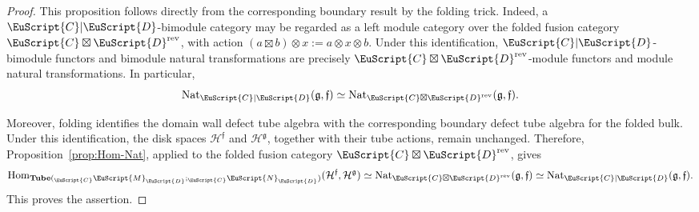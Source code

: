 \documentclass[a4paper,11pt]{article}
\theoremstyle{definition}
\theoremstyle{remark}
\newcommand\eC           {\EuScript{C}}
\newcommand\eD           {\EuScript{D}}
\newcommand\eM          {\EuScript{M}}
\newcommand\eN         {\EuScript{N}}
\newcommand{\Hom}{\operatorname{Hom}}
\newcommand{\Tube}{\mathbf{Tube}}
\begin{document}
\begin{proof}
This proposition follows directly from the corresponding boundary result by the folding trick. Indeed, a
$\eC|\eD$-bimodule category may be regarded as a left module category over the folded fusion category
$\eC\boxtimes\eD^{\mathrm{rev}}$, with action $(a\boxtimes b)\otimes x := a\otimes x\otimes b$. Under this identification, $\eC|\eD$-bimodule functors and bimodule natural transformations are precisely $\eC\boxtimes\eD^{\mathrm{rev}}$-module functors and module natural transformations. In particular,
\begin{equation*}
    \operatorname{Nat}_{\eC|\eD}(\mathfrak g,\mathfrak f)
    \simeq
    \operatorname{Nat}_{\eC\boxtimes\eD^{\mathrm{rev}}}
    (\mathfrak g,\mathfrak f).
\end{equation*}

Moreover, folding identifies the domain wall defect tube algebra with the corresponding boundary defect tube algebra for the folded bulk. Under this identification, the disk spaces $\mathcal H^{\mathfrak f}$ and $\mathcal H^{\mathfrak g}$, together with their tube actions, remain unchanged. Therefore, Proposition~\ref{prop:Hom-Nat}, applied to the folded fusion category
$\eC\boxtimes\eD^{\mathrm{rev}}$, gives
\begin{equation*}
    \Hom_{\Tube({}_{\eC}\eM_{\eD};{}_{\eC}\eN_{\eD})}(\mathcal H^{\mathfrak f},\mathcal H^{\mathfrak g})\simeq \operatorname{Nat}_{\eC\boxtimes\eD^{\mathrm{rev}}} (\mathfrak g,\mathfrak f)\simeq  \operatorname{Nat}_{\eC|\eD} (\mathfrak g,\mathfrak f).
\end{equation*}
This proves the assertion.
\end{proof}
\end{document}
